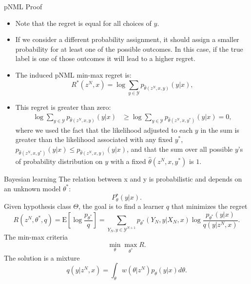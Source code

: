 \documentclass[aspectratio=169]{beamer}
\begin{document}
\begin{frame}{pNML Proof}
\begin{itemize}
\item Note that the regret is equal for all choices of $y$.
\item  If we consider a different probability assignment, it should assign a smaller probability for at least one of the possible outcomes. In this case, if the true label is one of those outcomes it will lead to a higher regret. 
\item The induced pNML min-max regret is:
\begin{equation} \label{individual_regret}
R^*(z^{N},x) = \log\sum_{y \in \mathcal{Y}}p_{\hat{\theta}(z^N,x,y)}(y|x), 
\end{equation}
\item This regret is greater than zero:
\begin{equation} \label{individual_regret_positive}
\begin{split}
\log\sum_{y \in \mathcal{Y}}p_{\hat{\theta}(z^N,x,y)}(y|x)
&\geq \log\sum_{y  \in \mathcal{Y}}p_{\hat{\theta}(z^N,x,y^*)}(y|x) = 0, \nonumber
\end{split}
\end{equation}
where we used the fact that the likelihood adjusted to each $y$ in the sum is greater than the likelihood associated with any fixed $y^*$, $p_{\hat{\theta}(z^N,x,y^*)}(y|x) \leq p_{\hat{\theta}(z^N,x,y)}(y|x)$, and that the sum over all possible $y$'s of probability distribution on $y$ with a fixed $\hat{\theta}(z^N,x,y^*)$ is $1$.
\end{itemize}
\end{frame}

\begin{frame}{Bayesian learning}
The relation between x and y is probabilistic and depends on an unknown model $\theta^*$:
\begin{equation}
    P{_\theta^*}(y|x).
\end{equation} 
Given hypothesis class $\Theta$, the goal is to find a learner $q$ that minimizes the regret
\begin{equation}
R(z^N,\theta^*,q) = \mathrm{E} \left[ \log \frac{p_{\theta^*}}{q} \right] = \sum_{Y_N,y \in \mathcal{Y}^{N+1}} p_{\theta^*}(Y_N,y|X_N,x) \log \frac{p_{\theta^*}(y|x)}{q (y|z^N,x)}.
\end{equation}
The min-max criteria
\begin{equation}
    \min_{\theta} \max_{\theta^*} R.
\end{equation}
The solution is a mixture
\begin{equation}
q(y|z^N,x) = \int_{
\theta} w(\theta|z^N) p_{\theta}(y|x) d \theta.
\end{equation}
\end{frame}
\end{document}
